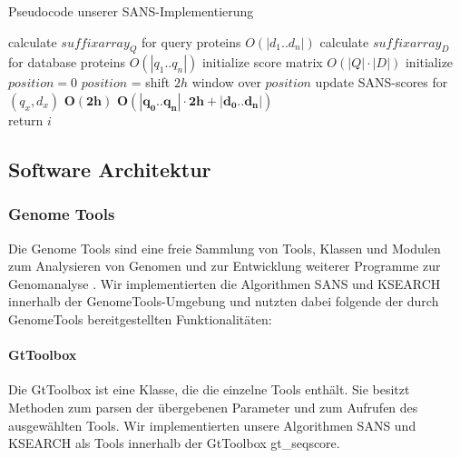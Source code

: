 \documentclass{article}
\begin{document}
\begin{algorithm}
  \caption{Pseudocode unserer SANS-Implementierung}
 \begin{algorithmic}
     \State calculate $suffixarray_Q$ for query proteins \Comment $O(|d_1..d_n|)$
     \State calculate $suffixarray_D$ for database proteins \Comment $O(|q_1..q_n|)$
     \State initialize score matrix \Comment $O(|Q|\cdot|D|)$
     \State initialize $position = 0$
       \State  $position$ =  
       \State shift $2h$ window over $position$ 
         \State update SANS-scores for  $(q_x,d_x)$
       \EndFor \Comment $\mathbf{O(2h)}$
     \EndFor \Comment $\mathbf{O(|q_0..q_n|\cdot2h + |d_0..d_n|)}$
    \EndFunction  {}   \\
    
          \State return $i$ 
        \EndIf
      \EndFor 
    \EndFunction
  \end{algorithmic}
\end{algorithm}

\subsection{Software Architektur}

\subsubsection{Genome Tools}

Die Genome Tools sind eine freie Sammlung von Tools, Klassen und Modulen zum
Analysieren von Genomen und zur Entwicklung weiterer Programme zur Genomanalyse \cite{gtools}. Wir implementierten die Algorithmen SANS und KSEARCH innerhalb der GenomeTools-Umgebung und nutzten dabei folgende der durch GenomeTools bereitgestellten Funktionalitäten:

\paragraph{GtToolbox}
Die GtToolbox ist eine Klasse, die die einzelne Tools enthält. Sie besitzt
Methoden zum parsen der übergebenen Parameter und zum Aufrufen des ausgewählten
Tools. Wir implementierten unsere Algorithmen SANS und KSEARCH als Tools
innerhalb der GtToolbox gt\_seqscore. 
\end{document}
